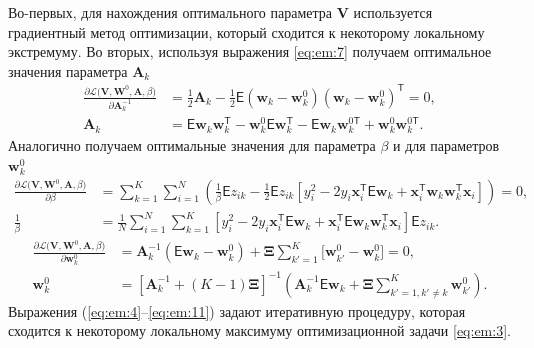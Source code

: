 Во-первых, для нахождения оптимального параметра $\textbf{V}$ используется градиентный метод оптимизации, который сходится к некоторому локальному экстремуму.
Во вторых, используя выражения \eqref{eq:em:7} получаем оптимальное значения параметра $\textbf{A}_{k}$
\[
\label{eq:em:9}
\begin{aligned}
\frac{\partial \mathcal{L}\bigr(\textbf{V}, \textbf{W}^{0}, \textbf{A}, \beta\bigr)}{\partial \textbf{A}^{-1}_k} &=  \frac{1}{2}\textbf{A}_{k} - \frac{1}{2}\mathsf{E}\left(\textbf{w}_{k} - \textbf{w}_{k}^{0}\right)\left(\textbf{w}_{k} - \textbf{w}_{k}^{0}\right)^{\mathsf{T}} = 0,\\
\textbf{A}_{k} &= \mathsf{E}\textbf{w}_{k}\textbf{w}_{k}^{\mathsf{T}} - \textbf{w}_{k}^{0}\mathsf{E}\textbf{w}_{k}^{\mathsf{T}} - \mathsf{E}\textbf{w}_{k}\textbf{w}_{k}^{0\mathsf{T}} + \textbf{w}_{k}^{0}\textbf{w}_{k}^{0\mathsf{T}}.
\end{aligned}
\]
Аналогично получаем оптимальные значения для параметра $\beta$ и для параметров $\textbf{w}_{k}^{0}$
\[
\label{eq:em:10}
\begin{aligned}
\frac{\partial \mathcal{L}\bigr(\textbf{V}, \textbf{W}^{0}, \textbf{A}, \beta\bigr)}{\partial \beta} &= \sum_{k=1}^{K}\sum_{i=1}^{N}\left(\frac{1}{\beta}\mathsf{E}z_{ik}-\frac{1}{2}\mathsf{E}z_{ik}\left[y_{i}^{2}-2y_{i}\textbf{x}_{i}^{\mathsf{T}}\mathsf{E}\textbf{w}_{k}+\textbf{x}_{i}^{\mathsf{T}}\textbf{w}_{k}\textbf{w}_{k}^{\mathsf{T}}\textbf{x}_{i}\right]\right) = 0,\\
\frac{1}{\beta}&=\frac{1}{N}\sum_{i=1}^{N}\sum_{k=1}^{K}\left[y_{i}^{2}-2y_{i}\textbf{x}_{i}^{\mathsf{T}}\mathsf{E}\textbf{w}_{k} + \textbf{x}_{i}^{\mathsf{T}}\mathsf{E}\textbf{w}_{k}\textbf{w}_{k}^{\mathsf{T}}\textbf{x}_{i}\right]\mathsf{E}z_{ik}.
\end{aligned}
\]
\[
\label{eq:em:11}
\begin{aligned}
\frac{\partial \mathcal{L}\bigr(\textbf{V}, \textbf{W}^{0}, \textbf{A}, \beta\bigr)}{\partial \mathbf{w}_k^0} &= \mathbf{A}_k^{-1}\left(\mathsf{E}\mathbf{w}_k - \mathbf{w}_{k}^{0}\right) + \bm{\Xi}\sum_{k'=1}^{K}\bigr[\mathbf{w}_{k'}^{0} -\mathbf{w}_{k}^{0}\bigr] = 0,\\
\textbf{w}_{k}^{0} &=\left[\textbf{A}_{k}^{-1}+\left(K-1\right)\bm{\Xi}\right]^{-1}\left(\textbf{A}^{-1}_{k}\mathsf{E}\textbf{w}_{k}+\bm{\Xi}\sum_{k'=1, k'\not=k}^{K}\textbf{w}_{k'}^{0}\right).
\end{aligned}
\]
Выражения (\ref{eq:em:4}--\ref{eq:em:11}) задают итеративную процедуру, которая сходится к некоторому локальному максимуму оптимизационной задачи \eqref{eq:em:3}.


